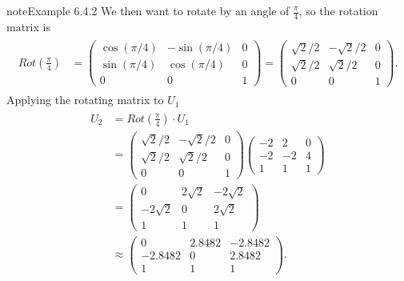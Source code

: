 \documentclass[letterpaper,10pt,english]{jupyterBook}
\begin{document}
\begin{sphinxadmonition}{note}{Example 6.4.2}
\sphinxAtStartPar
We then want to rotate by an angle of \(\frac{\pi}{4}\), so the rotation matrix is
\begin{equation*}
\begin{split} \begin{align*}
    Rot\left( \frac{\pi}{4} \right) &=
    \begin{pmatrix}
        \cos(\pi/4) & -\sin(\pi/4) & 0 \\
        \sin(\pi/4) & \cos(\pi/4) & 0 \\
        0 & 0 & 1
    \end{pmatrix}
    = \begin{pmatrix}
        \sqrt{2}/2 & -\sqrt{2}/2 & 0 \\
        \sqrt{2}/2 & \sqrt{2}/2 & 0 \\
        0 & 0 & 1
    \end{pmatrix}.
\end{align*} \end{split}
\end{equation*}
\sphinxAtStartPar
Applying the rotating matrix to \(U_1\)
\begin{equation*}
\begin{split} \begin{align*}
    U_2 &= Rot\left(\frac{\pi}{4}\right) \cdot U_1  \\
    &= \begin{pmatrix}
        \sqrt{2}/2 & -\sqrt{2}/2 & 0 \\
        \sqrt{2}/2 & \sqrt{2}/2 & 0 \\
        0 & 0 & 1
    \end{pmatrix}
    \begin{pmatrix} -2 & 2 & 0 \\ -2 & -2 & 4 \\ 1 & 1 & 1 \end{pmatrix} \\
    &= \begin{pmatrix}
        0 & 2 \sqrt{2} & -2\sqrt{2} \\
        -2\sqrt{2} & 0 & 2\sqrt{2} \\
        1 & 1 & 1
    \end{pmatrix} \\
    &\approx \begin{pmatrix}
        0 & 2.8482 & -2.8482 \\
        -2.8482 & 0 & 2.8482 \\
        1 & 1 & 1
    \end{pmatrix}.
\end{align*} \end{split}
\end{equation*}
\begin{figure}[htbp]
\centering
\capstart


\end{figure}
\end{sphinxadmonition}
\end{document}
